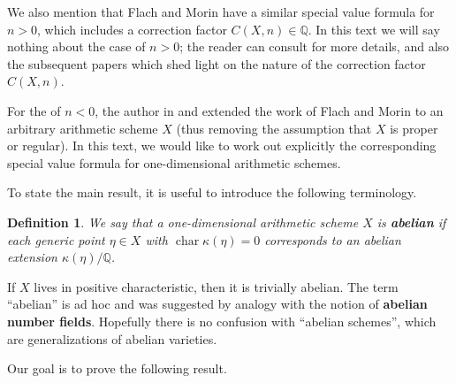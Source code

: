 \documentclass[draft]{article}
\DeclareMathOperator{\fchar}{char}
\newcommand{\QQ}{\mathbb{Q}}
\theoremstyle{myplain}
\theoremstyle{mydefinition}
\newtheorem{definition}[theorem]{Definition}
\begin{document}
We also mention that Flach and Morin have a similar special value formula for
$n > 0$, which includes a correction factor $C (X,n) \in \QQ$. In this text we
will say nothing about the case of $n > 0$; the reader can consult
\cite{Flach-Morin-2018} for more details, and also the subsequent papers
\cite{Flach-Morin-2020,Flach-Morin-2020-Muenster,Morin-2021-THH} which shed
light on the nature of the correction factor $C (X,n)$.

For the of $n < 0$, the author in \cite{Beshenov-Weil-etale-1} and
\cite{Beshenov-Weil-etale-2} extended the work of Flach and Morin
\cite{Flach-Morin-2018} to an arbitrary arithmetic scheme $X$ (thus removing the
assumption that $X$ is proper or regular). In this text, we would like to work
out explicitly the corresponding special value formula for one-dimensional
arithmetic schemes.

\vspace{1em}

To state the main result, it is useful to introduce the following terminology.

\begin{definition}
  \label{dfn:abelian-scheme}
  We say that a one-dimensional arithmetic scheme $X$ is \textbf{abelian} if
  each generic point $\eta \in X$ with $\fchar \kappa (\eta) = 0$ corresponds to
  an abelian extension $\kappa (\eta)/\QQ$.
\end{definition}

If $X$ lives in positive characteristic, then it is trivially abelian.
The term ``abelian'' is ad hoc and was suggested by analogy with the notion of
\textbf{abelian number fields}. Hopefully there is no confusion with
``abelian schemes'', which are generalizations of abelian varieties.

Our goal is to prove the following result.
\end{document}
